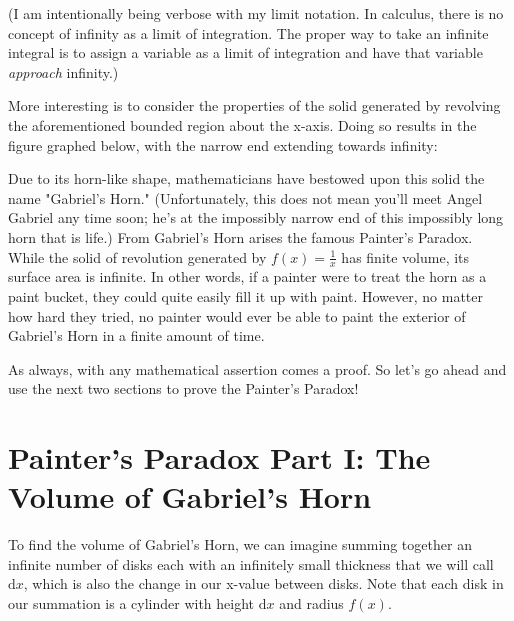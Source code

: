 \documentclass{article}[11pt]
\begin{document}
(I am intentionally being verbose with my limit notation. In calculus, there is no concept of infinity as a limit of integration. The proper way to take an infinite integral is to assign a variable as a limit of integration and have that variable \emph{approach} infinity.)

More interesting is to consider the properties of the solid generated by revolving the aforementioned bounded region about the x-axis. Doing so results in the figure graphed below, with the narrow end extending towards infinity:
\hspace{11pt}

\begin{center}
\end{center}

Due to its horn-like shape, mathematicians have bestowed upon this solid the name "Gabriel's Horn." (Unfortunately, this does not mean you'll meet Angel Gabriel any time soon; he's at the impossibly narrow end of this impossibly long horn that is life.) From Gabriel's Horn arises the famous Painter's Paradox. While the solid of revolution generated by $f(x) = \frac1x$ has finite volume, its surface area is infinite. In other words, if a painter were to treat the horn as a paint bucket, they could quite easily fill it up with paint. However, no matter how hard they tried, no painter would ever be able to paint the exterior of Gabriel's Horn in a finite amount of time.

As always, with any mathematical assertion comes a proof. So let's go ahead and use the next two sections to prove the Painter's Paradox!

\section{Painter's Paradox Part I: The Volume of Gabriel's Horn}
To find the volume of Gabriel's Horn, we can imagine summing together an infinite number of disks each with an infinitely small thickness that we will call $\textrm{d}x$, which is also the change in our x-value between disks. Note that each disk in our summation is a cylinder with height $\textrm{d}x$ and radius $f(x)$.
\end{document}
